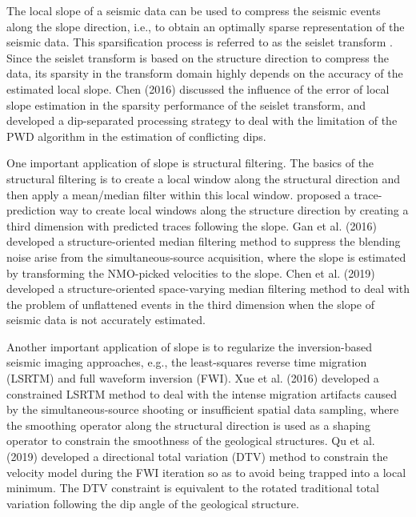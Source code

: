The local slope of a seismic data can be used to compress the seismic events along the slope direction, i.e., to obtain an optimally sparse representation of the seismic data. This sparsification process is referred to as the seislet transform \cite{fomel2010seislet}. Since the seislet transform is based on the structure direction to compress the data, its sparsity in the transform domain highly depends on the accuracy of the estimated local slope. Chen (2016) \cite{yangkang2016emd} discussed the influence of the error of local slope estimation in the sparsity performance of the seislet transform, and developed a dip-separated processing strategy to deal with the limitation of the PWD algorithm in the estimation of conflicting dips. 

One important application of slope is structural filtering. The basics of the structural filtering is to create a local window along the structural direction and then apply a mean/median filter within this local window.  \cite{liuyang2010} proposed a trace-prediction way to create local windows along the structure direction by creating a third dimension with predicted traces following the slope. Gan et al. (2016) \cite{shuwei2016somf} developed a structure-oriented median filtering method to suppress the blending noise arise from the simultaneous-source acquisition, where the slope is estimated by transforming the NMO-picked velocities to the slope. Chen et al. (2019) \cite{sosvmf} developed a structure-oriented space-varying median filtering method to deal with the problem of unflattened events in the third  dimension when the slope of seismic data is not accurately estimated. 

Another important application of slope is to regularize the inversion-based seismic imaging approaches, e.g., the least-squares reverse time migration (LSRTM) and full waveform inversion (FWI). Xue et al. (2016) \cite{zhiguang2016} developed a constrained LSRTM method to deal with the intense migration artifacts caused by the simultaneous-source shooting or insufficient spatial data sampling, where the smoothing operator along the structural direction is used as a shaping operator to constrain the smoothness of the geological structures. Qu et al. (2019) \cite{qushan2019geo} developed a directional total variation (DTV) method to constrain the velocity model during the FWI iteration so as to avoid being trapped into a local minimum. The DTV constraint is equivalent to the rotated traditional total variation following the dip angle of the geological structure. 

